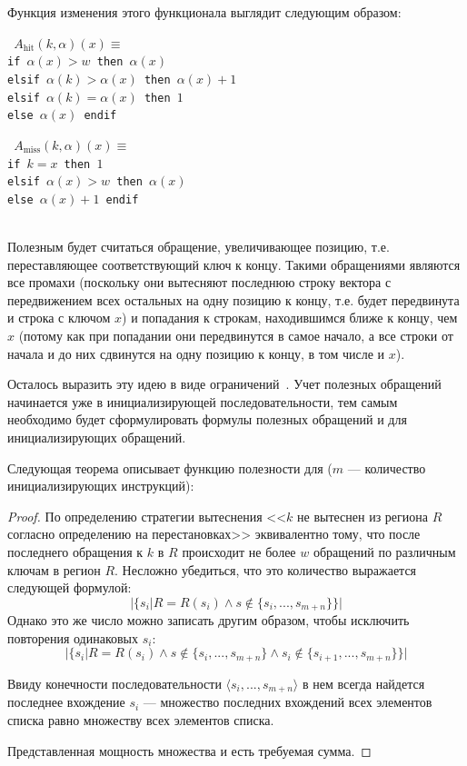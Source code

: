 Функция изменения этого функционала выглядит следующим образом:\\

\parbox{0.5\textwidth}{ \tt
$A_{\mbox{hit}}(k, \alpha)(x) \equiv$\\
if $\alpha(x) > w$ then $\alpha(x)$\\
elsif $\alpha(k) > \alpha(x)$ then $\alpha(x)+1$\\
elsif $\alpha(k) = \alpha(x)$ then $1$\\
else $\alpha(x)$ endif%
}\parbox{0.5\textwidth}{\tt
$A_{\mbox{miss}}(k, \alpha)(x) \equiv$\\
if $k = x$ then $1$\\
elsif $\alpha(x) > w$ then $\alpha(x)$\\
else $\alpha(x) + 1$ endif}\\

Полезным будет считаться обращение, увеличивающее позицию, т.е.
переставляющее соответствующий ключ к концу. Такими обращениями являются все
промахи (поскольку они вытесняют последнюю строку вектора с передвижением всех остальных на одну позицию к концу, т.е. будет передвинута и строка с ключом $x$) и
попадания к строкам, находившимся ближе к концу, чем $x$ (потому как при попадании они передвинутся в самое начало, а все строки от начала и до них сдвинутся на одну
позицию к концу, в том числе и $x$).

Осталось выразить эту идею в виде ограничений~\cite{my_ewdts_2009}.
Учет полезных обращений начинается уже в инициализирующей последовательности,
тем самым необходимо будет сформулировать формулы полезных обращений и для
инициализирующих обращений.

Следующая теорема описывает функцию полезности для \LRU ($m$ --- количество
инициализирующих инструкций):

\begin{theorem}\label{correct_mirror_LRU} \LRUusefuls
\end{theorem}

\begin{proof}
По определению стратегии вытеснения \LRU <<$k$ не вытеснен из региона $R$ согласно определению на перестановках>> эквивалентно тому, что после последнего обращения к $k$ в $R$ происходит не более $w$ обращений по различным ключам в регион $R$. Несложно убедиться, что это количество выражается следующей формулой: $$|\{s_i| R = R(s_i) \wedge s \notin \{s_i, ..., s_{m+n}\}\}|$$
Однако это же число можно записать другим образом, чтобы исключить повторения одинаковых $s_i$:
$$|\{s_i| R = R(s_i) \wedge s \notin \{s_i, ..., s_{m+n}\} \wedge s_i \notin \{s_{i+1}, ..., s_{m+n}\}\}|$$

Ввиду конечности последовательности $\langle s_i, ..., s_{m+n}\rangle$ в нем всегда найдется последнее вхождение $s_i$ --- множество последних вхождений всех элементов списка равно множеству всех элементов списка.

Представленная мощность множества и есть требуемая сумма.
\end{proof}

